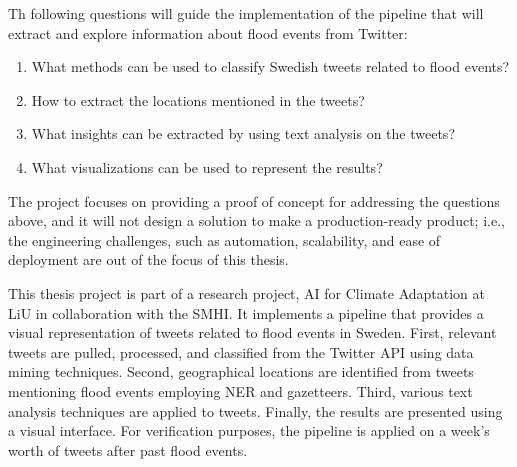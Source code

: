 Th following questions will guide the implementation of the pipeline that will extract and explore
information about flood events from Twitter:
\begin{enumerate} 
  \item What methods can be used to classify Swedish tweets related to flood events?
  \item How to extract the locations mentioned in the tweets? 
  \item What insights can be extracted by using text analysis on the tweets?
  \item What visualizations can be used to represent the results? 
\end{enumerate}

The project focuses on providing a proof of concept for addressing the questions above, and it will
not design a solution to make a production-ready product; i.e., the engineering challenges, such as
automation, scalability, and ease of deployment are out of the focus of this thesis. 

This thesis project is part of a research project, AI for Climate Adaptation
\cite{nesetAI4ClimateAdaptation} at \ac{LiU} in collaboration with the \ac{SMHI}. It implements a
pipeline that provides a visual representation of tweets related to flood events in Sweden. First,
relevant tweets are pulled, processed, and classified from the Twitter \ac{API} using data mining
techniques. Second, geographical locations are identified from tweets mentioning flood events employing
\ac{NER} and gazetteers. Third, various text analysis techniques are applied to tweets. Finally, the
results are presented using a visual interface. For verification purposes, the pipeline is applied
on a week's worth of tweets after past flood events.
